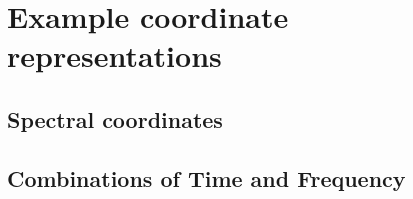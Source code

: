 \documentclass[a4paper,10pt,bibtotoc]{scrreprt}
\begin{document}
\chapter{Example coordinate representations}
\label{sec:examples}

\section{Spectral coordinates}

\section{Combinations of Time and Frequency}
\end{document}
